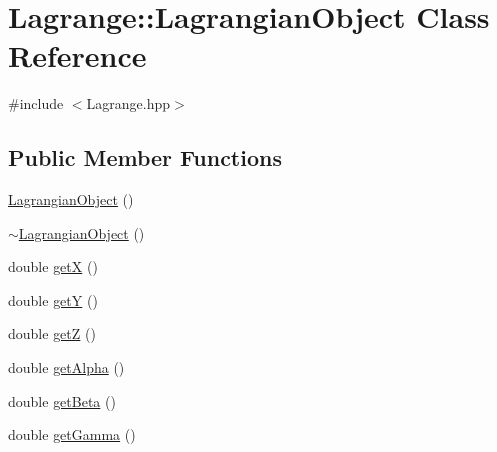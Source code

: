\hypertarget{class_lagrange_1_1_lagrangian_object}{\section{Lagrange\-:\-:Lagrangian\-Object Class Reference}
\label{class_lagrange_1_1_lagrangian_object}
}


{\ttfamily \#include $<$Lagrange.\-hpp$>$}

\subsection*{Public Member Functions}
\begin{DoxyCompactItemize}
\item 
\hyperlink{class_lagrange_1_1_lagrangian_object_a4d3e40326aa8904ef0f6df757d0ffa36}{Lagrangian\-Object} ()
\item 
\hyperlink{class_lagrange_1_1_lagrangian_object_a7b8af43209f370fa73e9ef80315decd2}{$\sim$\-Lagrangian\-Object} ()
\item 
double \hyperlink{class_lagrange_1_1_lagrangian_object_a492e12e6f8d293c133469b9dad0cf12c}{get\-X} ()
\item 
double \hyperlink{class_lagrange_1_1_lagrangian_object_a7909222d7950aadb3ad245e93f561284}{get\-Y} ()
\item 
double \hyperlink{class_lagrange_1_1_lagrangian_object_aec714f96a67ced912894f185b8d6b467}{get\-Z} ()
\item 
double \hyperlink{class_lagrange_1_1_lagrangian_object_aa5d4da3f10ddc6e0030ab9c498da5af4}{get\-Alpha} ()
\item 
double \hyperlink{class_lagrange_1_1_lagrangian_object_a25d5a657520a100f3d8a1cf01343ad08}{get\-Beta} ()
\item 
double \hyperlink{class_lagrange_1_1_lagrangian_object_a8a439494a8efe728068f39e39f21a5b6}{get\-Gamma} ()
\end{DoxyCompactItemize}


